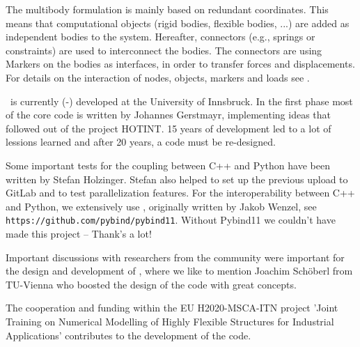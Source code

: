 The multibody formulation is mainly based on redundant coordinates. This means that computational objects (rigid bodies, flexible bodies, ...) are added as independent bodies to the system. Hereafter, connectors (e.g., springs or constraints) are used to interconnect the bodies. The connectors are using Markers on the bodies as interfaces, in order to transfer forces and displacements.
For details on the interaction of nodes, objects, markers and loads see .

\codeName\ is currently (\the\month-\the\year) developed at the University of Innsbruck.
In the first phase most of the core code is written by Johannes Gerstmayr, implementing ideas that followed out of the project HOTINT. 15 years of development led to a lot of lessions learned and after 20 years, a code must be re-designed.

Some important tests for the coupling between C++ and Python have been written by Stefan Holzinger. Stefan also helped to set up the previous upload to GitLab and to test parallelization features.
For the interoperability between C++ and Python, we extensively use \cite{pybind11}, originally written by Jakob Wenzel, see \texttt{https://github.com/pybind/pybind11}. Without Pybind11 we couldn't have made this project -- Thank's a lot!

Important discussions with researchers from the community were important for the design and development of \codeName , where we like to mention Joachim Sch{\"o}berl from TU-Vienna who boosted the design of the code with great concepts. 

The cooperation and funding within the EU H2020-MSCA-ITN project 'Joint Training on Numerical Modelling of Highly Flexible Structures for Industrial Applications' contributes to the development of the code.

